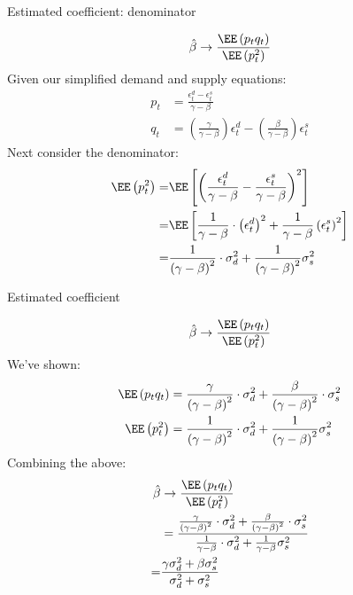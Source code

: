 \documentclass[compress, 8pt]{beamer}
\begin{document}
\begin{frame}{Estimated coefficient: denominator}

\begin{equation*}
    \hat{\beta} \rightarrow \frac{\EE\left(p_{t}q_{t}\right)}{\EE\left(p_{t}^{2}\right)}
\end{equation*}
Given our simplified demand and supply equations:
\begin{align*}
     p_t &= \frac{\epsilon_t^d - \epsilon_t^s}{\gamma - \beta} \\
    q_t &= \left(\frac{\gamma}{\gamma-\beta}\right)\epsilon_{t}^{d}-\left(\frac{\beta}{\gamma-\beta}\right)\epsilon_{t}^{s}
\end{align*}
Next consider the denominator:
\begin{align*}
\EE\left(p_{t}^{2}\right)= & \EE\left[\left(\frac{\epsilon_{t}^{d}}{\gamma-\beta}-\frac{\epsilon_{t}^{s}}{\gamma-\beta}\right)^{2}\right]\\
= & \EE\left[\frac{1}{\gamma-\beta}\cdot\left(\epsilon_{t}^{d}\right)^{2}+\frac{1}{\gamma-\beta}\left(\epsilon_{t}^{s}\right)^{2}\right]\\
= & \frac{1}{\left(\gamma-\beta\right)^{2}}\cdot\sigma_{d}^{2}+\frac{1}{\left(\gamma-\beta\right)^{2}}\sigma_{s}^{2}\\
\end{align*}
\end{frame}

\begin{frame}{Estimated coefficient}

\begin{equation*}
    \hat{\beta} \rightarrow \frac{\EE\left(p_{t}q_{t}\right)}{\EE\left(p_{t}^{2}\right)}
\end{equation*}
We've shown:
\begin{align*}
    \EE\left(p_{t}q_{t}\right) &= \frac{\gamma}{\left(\gamma-\beta\right)^{2}}\cdot\sigma_{d}^{2}+\frac{\beta}{\left(\gamma-\beta\right)^{2}}\cdot\sigma_{s}^{2} \\
    \EE\left(p_{t}^{2}\right) &= \frac{1}{\left(\gamma-\beta\right)^{2}}\cdot\sigma_{d}^{2}+\frac{1}{\left(\gamma-\beta\right)^{2}}\sigma_{s}^{2}
\end{align*}
Combining the above: 
\begin{align*}
    \hat{\beta} &\rightarrow \frac{\EE\left(p_{t}q_{t}\right)}{\EE\left(p_{t}^{2}\right)}  \\
    &= \frac{\frac{\gamma}{\left(\gamma-\beta\right)^{2}}\cdot\sigma_{d}^{2}+\frac{\beta}{\left(\gamma-\beta\right)^{2}}\cdot\sigma_{s}^{2}}{\frac{1}{\gamma-\beta}\cdot\sigma_{d}^{2}+\frac{1}{\gamma-\beta}\sigma_{s}^{2}}\\
= & \frac{\gamma\sigma_{d}^{2}+\beta\sigma_{s}^{2}}{\sigma_{d}^{2}+\sigma_{s}^{2}}
\end{align*}


\end{frame}
\end{document}
